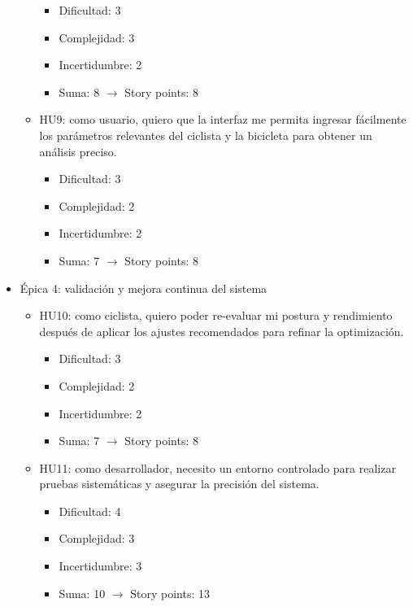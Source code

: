 \documentclass[
11pt, %
]{charter}
\begin{document}
\begin{itemize}
\begin{itemize}
        \begin{itemize}
          \item Dificultad: 3
          \item Complejidad: 3
          \item Incertidumbre: 2
          \item Suma: 8 $\rightarrow$ Story points: 8
        \end{itemize}
      \item HU9: como usuario, quiero que la interfaz me permita ingresar fácilmente los parámetros relevantes del ciclista y la bicicleta para obtener un análisis preciso.
        \begin{itemize}
          \item Dificultad: 3
          \item Complejidad: 2
          \item Incertidumbre: 2
          \item Suma: 7 $\rightarrow$ Story points: 8
        \end{itemize}
    \end{itemize}
  \item Épica 4: validación y mejora continua del sistema
    \begin{itemize}
      \item HU10: como ciclista, quiero poder re-evaluar mi postura y rendimiento después de aplicar los ajustes recomendados para refinar la optimización.
        \begin{itemize}
          \item Dificultad: 3
          \item Complejidad: 2
          \item Incertidumbre: 2
          \item Suma: 7 $\rightarrow$ Story points: 8
        \end{itemize}
      \item HU11: como desarrollador, necesito un entorno controlado para realizar pruebas sistemáticas y asegurar la precisión del sistema.
        \begin{itemize}
          \item Dificultad: 4
          \item Complejidad: 3
          \item Incertidumbre: 3
          \item Suma: 10 $\rightarrow$ Story points: 13
        \end{itemize}
    \end{itemize}
\end{itemize}
\end{document}
